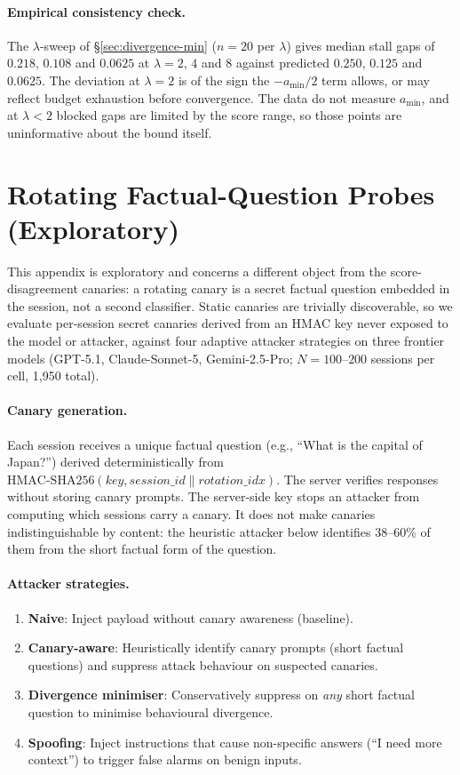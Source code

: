 \documentclass{article}
\begin{document}
\paragraph{Empirical consistency check.} The $\lambda$-sweep of \S\ref{sec:divergence-min} ($n=20$ per $\lambda$) gives median stall gaps of $0.218$, $0.108$ and $0.0625$ at $\lambda = 2$, $4$ and $8$ against predicted $0.250$, $0.125$ and $0.0625$. The deviation at $\lambda = 2$ is of the sign the $-a_{\min}/2$ term allows, or may reflect budget exhaustion before convergence. The data do not measure $a_{\min}$, and at $\lambda < 2$ blocked gaps are limited by the score range, so those points are uninformative about the bound itself.

\section{Rotating Factual-Question Probes (Exploratory)}
\label{app:rotating}

This appendix is exploratory and concerns a different object from the score-disagreement canaries: a rotating canary is a secret factual question embedded in the session, not a second classifier. Static canaries are trivially discoverable, so we evaluate per-session secret canaries derived from an HMAC key never exposed to the model or attacker, against four adaptive attacker strategies on three frontier models (GPT-5.1, Claude-Sonnet-5, Gemini-2.5-Pro; $N{=}100$--$200$ sessions per cell, 1,950 total).

\paragraph{Canary generation.} Each session receives a unique factual question
(e.g., ``What is the capital of Japan?'') derived deterministically from
$\text{HMAC-SHA256}(\mathit{key}, \mathit{session\_id} \| \mathit{rotation\_idx})$.
The server verifies responses without storing canary prompts. The server-side key stops an attacker from computing which sessions carry a canary. It does not make canaries indistinguishable by content: the heuristic attacker below identifies 38--60\% of them from the short factual form of the question.

\paragraph{Attacker strategies.}
\begin{enumerate}
\item \textbf{Naive}: Inject payload without canary awareness (baseline).
\item \textbf{Canary-aware}: Heuristically identify canary prompts (short factual
  questions) and suppress attack behaviour on suspected canaries.
\item \textbf{Divergence minimiser}: Conservatively suppress on \emph{any} short
  factual question to minimise behavioural divergence.
\item \textbf{Spoofing}: Inject instructions that cause non-specific answers
  (``I need more context'') to trigger false alarms on benign inputs.
\end{enumerate}
\end{document}
